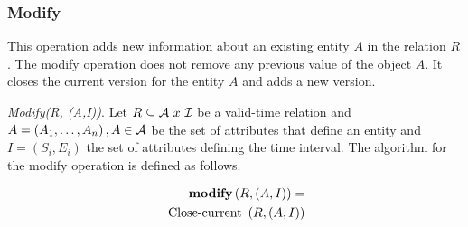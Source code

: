 %
\subsubsection{\label{subsubsec:modify}Modify}
This operation adds new information about an existing entity $A$ in the relation $R$. The modify operation does not remove any previous value of the object $A$. It closes the current version for the entity $A$ and adds a new version.



\begin{definition}
 \emph{Modify(R, (A,I))}.
Let $R \subseteq \mathcal{A}\  x\  \mathcal{I}$ be a valid-time relation and  $A=\left(A_1, \ldots, A_n \right), A \in \mathcal{A}$ be the set of attributes that define an entity and $I = \left(S_i,E_i\right)$ the set of attributes defining the time interval. The algorithm for the modify operation is defined as follows.
\end{definition}


\begin{align}
\label{eq:modify}
\MOD \left( R, \left(A, I \right)\right) =\\
\nonumber
\mbox{ Close-current }\left(R, \left(A, I\right) \right) %
\end{align}



